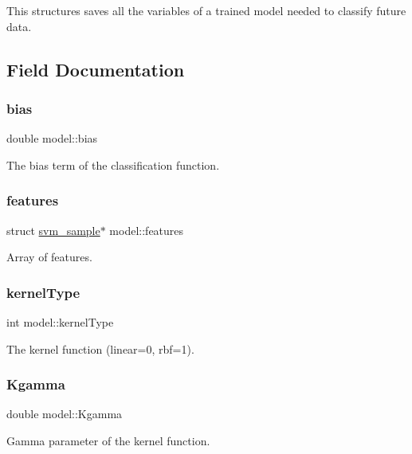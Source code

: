 This structures saves all the variables of a trained model needed to classify future data. 

\subsection{Field Documentation}
\hypertarget{structmodel_a9aef7cc709fca4e03a021623ce6c7ae6}{}\label{structmodel_a9aef7cc709fca4e03a021623ce6c7ae6} 
\subsubsection{\texorpdfstring{bias}{bias}}
{\ttfamily double model\+::bias}

The bias term of the classification function. \hypertarget{structmodel_ac034047dc48ef9be6739e48b13f8f65c}{}\label{structmodel_ac034047dc48ef9be6739e48b13f8f65c} 
\subsubsection{\texorpdfstring{features}{features}}
{\ttfamily struct \hyperlink{structsvm__sample}{svm\+\_\+sample}$\ast$ model\+::features}

Array of features. \hypertarget{structmodel_aaff8ca8579bd888fcfeca1c682618be9}{}\label{structmodel_aaff8ca8579bd888fcfeca1c682618be9} 
\subsubsection{\texorpdfstring{kernel\+Type}{kernelType}}
{\ttfamily int model\+::kernel\+Type}

The kernel function (linear=0, rbf=1). \hypertarget{structmodel_ac5c18eca6ad32bc6da1f2a923965e66c}{}\label{structmodel_ac5c18eca6ad32bc6da1f2a923965e66c} 
\subsubsection{\texorpdfstring{Kgamma}{Kgamma}}
{\ttfamily double model\+::\+Kgamma}

Gamma parameter of the kernel function. \hypertarget{structmodel_ac6ba8c1bc138143114cd331583f41387}{}\label{structmodel_ac6ba8c1bc138143114cd331583f41387} 
